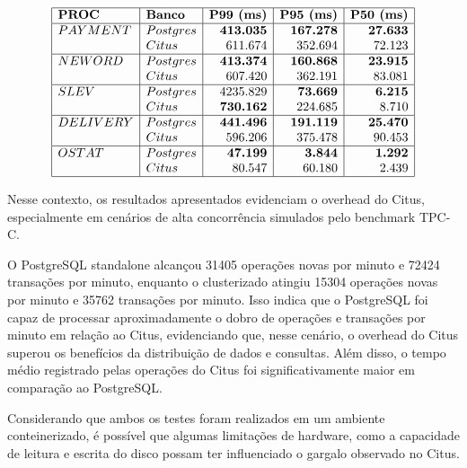 \[
\begin{array}{|l|l|r|r|r|}
\hline
\textbf{PROC} & \textbf{Banco} & \textbf{P99 (ms)} & \textbf{P95 (ms)} & \textbf{P50 (ms)} \\
\hline
PAYMENT & Postgres & \textbf{413.035} & \textbf{167.278} & \textbf{27.633} \\
        & Citus    & 611.674          & 352.694          & 72.123 \\
\hline
NEWORD  & Postgres & \textbf{413.374} & \textbf{160.868} & \textbf{23.915} \\
        & Citus    & 607.420          & 362.191          & 83.081 \\
\hline
SLEV    & Postgres & 4235.829         & \textbf{73.669}  & \textbf{6.215} \\
        & Citus    & \textbf{730.162} & 224.685          & 8.710 \\
\hline
DELIVERY& Postgres & \textbf{441.496} & \textbf{191.119} & \textbf{25.470} \\
        & Citus    & 596.206          & 375.478          & 90.453 \\
\hline
OSTAT   & Postgres & \textbf{47.199}  & \textbf{3.844}   & \textbf{1.292} \\
        & Citus    & 80.547           & 60.180           & 2.439 \\
\hline
\end{array}
\]

Nesse contexto, os resultados apresentados evidenciam o overhead do Citus, especialmente em cenários de alta concorrência simulados pelo benchmark TPC-C.

O PostgreSQL standalone alcançou 31405 operações novas por minuto e 72424 transações por minuto, 
enquanto o clusterizado atingiu 15304 operações novas por minuto e 35762 transações por minuto.
Isso indica que o PostgreSQL foi capaz de processar aproximadamente o dobro de operações e transações por minuto em relação ao Citus,
evidenciando que, nesse cenário, o overhead do Citus superou os benefícios da distribuição de dados e consultas.
Além disso, o tempo médio registrado pelas operações do Citus foi significativamente maior em comparação ao PostgreSQL.

Considerando que ambos os testes foram realizados em um ambiente conteinerizado, é possível que 
algumas limitações de hardware, como a capacidade de leitura e escrita do disco possam ter influenciado o gargalo observado no Citus.
